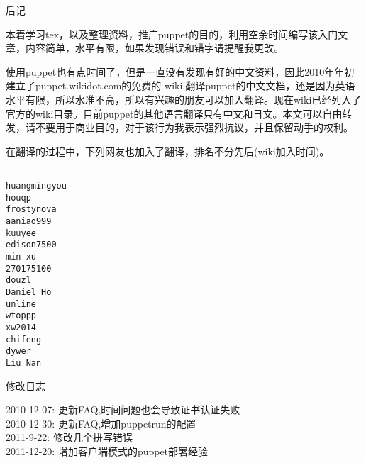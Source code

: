 
\newpage
\begin{center}
\msyh
后记
\end{center}
\fsong
\par
本着学习tex，以及整理资料，推广puppet的目的，利用空余时间编写该入门文章，内容简单，水平有限，如果发现错误和错字请提醒我更改。\par
使用puppet也有点时间了，但是一直没有发现有好的中文资料，因此2010年年初建立了puppet.wikidot.com的免费的 wiki,翻译puppet的中文文档，还是因为英语水平有限，所以水准不高，所以有兴趣的朋友可以加入翻译。现在wiki已经列入了官方的wiki目录。目前puppet的其他语言翻译只有中文和日文。本文可以自由转发，请不要用于商业目的，对于该行为我表示强烈抗议，并且保留动手的权利。\par
在翻译的过程中，下列网友也加入了翻译，排名不分先后(wiki加入时间)。\par

\msyh \begin{lstlisting}

huangmingyou	
houqp	
frostynova	
aaniao999	
kuuyee	
edison7500	
min xu	
270175100	
douzl	
Daniel Ho	
unline	
wtoppp	
xw2014	
chifeng	
dywer	
Liu Nan	
\end{lstlisting} \song

\newpage
\begin{center}
\msyh
修改日志
\end{center}
\fsong

2010-12-07:	更新FAQ,时间问题也会导致证书认证失败\\
2010-12-30:	更新FAQ,增加puppetrun的配置\\
2011-9-22:	修改几个拼写错误\\
2011-12-20:	增加客户端模式的puppet部署经验\\
